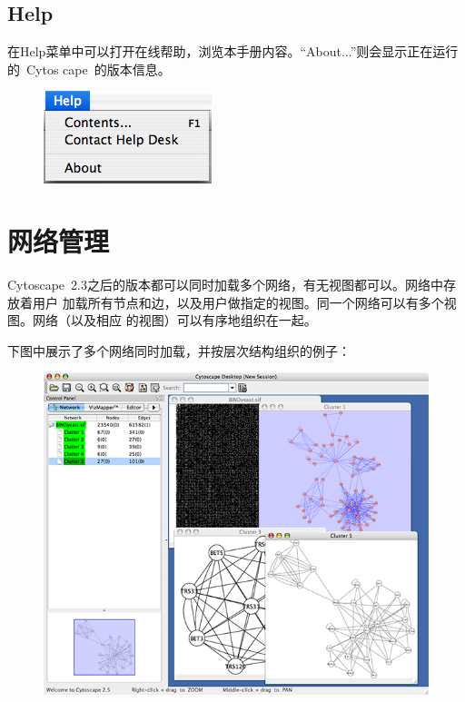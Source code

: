 	\subsection{Help}
	在Help菜单中可以打开在线帮助，浏览本手册内容。“About...”则会显示正在运行的~Cytos
	cape~的版本信息。
	\begin{figure}[!h]
	\centerline{\includegraphics[scale=0.6]{images/menu_help_25.png}}
	\end{figure}

\section{网络管理}
	Cytoscape~2.3之后的版本都可以同时加载多个网络，有无视图都可以。网络中存放着用户
	加载所有节点和边，以及用户做指定的视图。同一个网络可以有多个视图。网络（以及相应
	的视图）可以有序地组织在一起。

    下图中展示了多个网络同时加载，并按层次结构组织的例子：

    \begin{figure}[!h]
    \includegraphics[width=\textwidth]{images/cytoscape_network_hierarchy_25.png}
    \end{figure}

